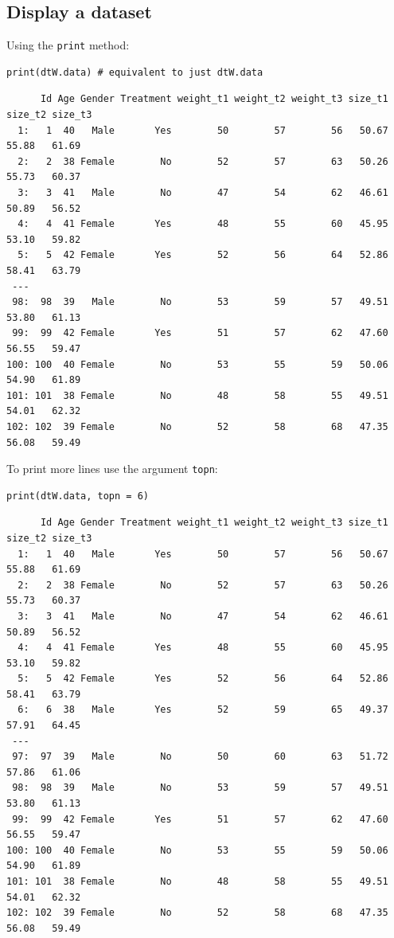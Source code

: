 \documentclass{article}
\begin{document}
\subsection{Display a dataset}
\label{sec:orge95e309}

Using the \texttt{print} method:
\lstset{language=r,label= ,caption= ,captionpos=b,numbers=none}
\begin{lstlisting}
print(dtW.data) # equivalent to just dtW.data
\end{lstlisting}

\begin{verbatim}
      Id Age Gender Treatment weight_t1 weight_t2 weight_t3 size_t1 size_t2 size_t3
  1:   1  40   Male       Yes        50        57        56   50.67   55.88   61.69
  2:   2  38 Female        No        52        57        63   50.26   55.73   60.37
  3:   3  41   Male        No        47        54        62   46.61   50.89   56.52
  4:   4  41 Female       Yes        48        55        60   45.95   53.10   59.82
  5:   5  42 Female       Yes        52        56        64   52.86   58.41   63.79
 ---                                                                               
 98:  98  39   Male        No        53        59        57   49.51   53.80   61.13
 99:  99  42 Female       Yes        51        57        62   47.60   56.55   59.47
100: 100  40 Female        No        53        55        59   50.06   54.90   61.89
101: 101  38 Female        No        48        58        55   49.51   54.01   62.32
102: 102  39 Female        No        52        58        68   47.35   56.08   59.49
\end{verbatim}

To print more lines use the argument \texttt{topn}:
\lstset{language=r,label= ,caption= ,captionpos=b,numbers=none}
\begin{lstlisting}
print(dtW.data, topn = 6)
\end{lstlisting}

\begin{verbatim}
      Id Age Gender Treatment weight_t1 weight_t2 weight_t3 size_t1 size_t2 size_t3
  1:   1  40   Male       Yes        50        57        56   50.67   55.88   61.69
  2:   2  38 Female        No        52        57        63   50.26   55.73   60.37
  3:   3  41   Male        No        47        54        62   46.61   50.89   56.52
  4:   4  41 Female       Yes        48        55        60   45.95   53.10   59.82
  5:   5  42 Female       Yes        52        56        64   52.86   58.41   63.79
  6:   6  38   Male       Yes        52        59        65   49.37   57.91   64.45
 ---                                                                               
 97:  97  39   Male        No        50        60        63   51.72   57.86   61.06
 98:  98  39   Male        No        53        59        57   49.51   53.80   61.13
 99:  99  42 Female       Yes        51        57        62   47.60   56.55   59.47
100: 100  40 Female        No        53        55        59   50.06   54.90   61.89
101: 101  38 Female        No        48        58        55   49.51   54.01   62.32
102: 102  39 Female        No        52        58        68   47.35   56.08   59.49
\end{verbatim}
\end{document}
